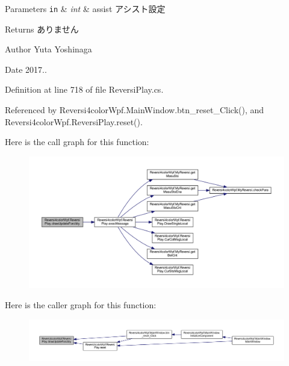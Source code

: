 \begin{DoxyParams}[1]{Parameters}
\mbox{\tt in}  & {\em int} & assist アシスト設定 \\
\hline
\end{DoxyParams}
\begin{DoxyReturn}{Returns}
ありません 
\end{DoxyReturn}
\begin{DoxyAuthor}{Author}
Yuta Yoshinaga 
\end{DoxyAuthor}
\begin{DoxyDate}{Date}
2017.. 
\end{DoxyDate}


Definition at line 718 of file Reversi\+Play.\+cs.



Referenced by Reversi4color\+Wpf.\+Main\+Window.\+btn\+\_\+reset\+\_\+\+Click(), and Reversi4color\+Wpf.\+Reversi\+Play.\+reset().

Here is the call graph for this function\+:
\nopagebreak
\begin{figure}[H]
\begin{center}
\leavevmode
\includegraphics[width=350pt]{class_reversi4color_wpf_1_1_reversi_play_a4669f078f21525854defe55a689fe2de_cgraph}
\end{center}
\end{figure}
Here is the caller graph for this function\+:
\nopagebreak
\begin{figure}[H]
\begin{center}
\leavevmode
\includegraphics[width=350pt]{class_reversi4color_wpf_1_1_reversi_play_a4669f078f21525854defe55a689fe2de_icgraph}
\end{center}
\end{figure}
\mbox{\label{class_reversi4color_wpf_1_1_reversi_play_ababce684128da36e97a45ad8a13e4b71}} 
